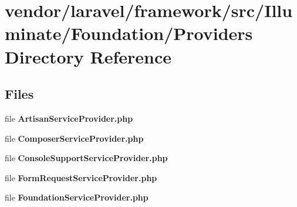 \section{vendor/laravel/framework/src/\+Illuminate/\+Foundation/\+Providers Directory Reference}
\label{dir_e84856aadd3662e9e76626e119df92ce}
\subsection*{Files}
\begin{DoxyCompactItemize}
\item 
file {\bf Artisan\+Service\+Provider.\+php}
\item 
file {\bf Composer\+Service\+Provider.\+php}
\item 
file {\bf Console\+Support\+Service\+Provider.\+php}
\item 
file {\bf Form\+Request\+Service\+Provider.\+php}
\item 
file {\bf Foundation\+Service\+Provider.\+php}
\end{DoxyCompactItemize}
